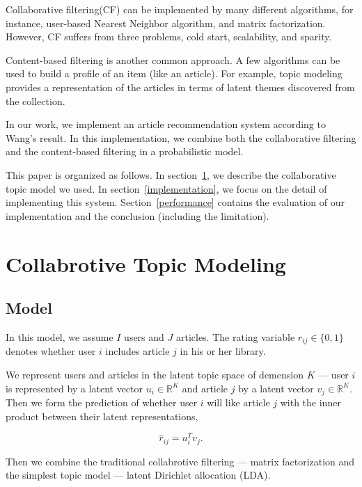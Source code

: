 \documentclass{acm_proc_article-sp}
\begin{document}
Collaborative filtering(CF) can be implemented by many different algorithms, for instance, user-based Nearest Neighbor algorithm\cite{website:cf}, and matrix factorization\cite{website:wiki}. However, CF suffers from three problems, cold start, scalability, and sparity.\cite{website:wiki}

Content-based filtering is another common approach. A few algorithms can be used to build a profile of an item (like an article). For example, topic modeling provides a representation of the articles in terms of latent themes discovered from the collection.

In our work, we implement an article recommendation system according to Wang's result\cite{wang:2011:CTM:2020408.2020480}. In this implementation, we combine both the collaborative filtering and the content-based filtering in a probabilistic model.

This paper is organized as follows. In section~\ref{models}, we describe the collaborative topic model we used. In section~\ref{implementation}, we focus on the detail of implementing this system. Section~\ref{performance} contains the evaluation of our implementation and the conclusion (including the limitation).

\section{Collabrotive Topic Modeling}
\label{models}
\subsection{Model}
In this model\cite{wang:2011:CTM:2020408.2020480}, we assume $I$ users and $J$ articles. The rating variable $r_{ij}\in\{0,1\}$ denotes whether user $i$ includes article $j$ in his or her library.

We represent users and articles in the latent topic space of demension $K$ --- user $i$ is represented by a latent vector $u_i \in \mathbb{R}^K$ and article $j$ by a latent vector $v_j \in \mathbb{R}^K$. Then we form the prediction of whether user $i$ will like article $j$ with the inner product between their latent representations,

\begin{equation}\label{eq:prediction}
\hat{r}_{ij}=u_i^Tv_j.
\end{equation}

Then we combine the traditional collabrotive filtering --- matrix factorization\cite{Koren_Bell_Volinsky_2009} and the simplest topic model --- latent Dirichlet allocation (LDA)\cite{Hockenmaier_Blei_Ng_Latent_2009}.
\end{document}
